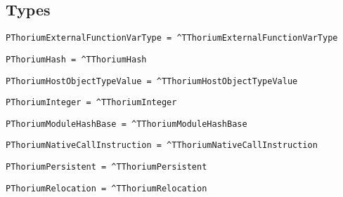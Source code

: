 \subsection{Types}
\label{thoriumtypes}

\begin{verbatim}
PThoriumExternalFunctionVarType = ^TThoriumExternalFunctionVarType
\end{verbatim}
\label{thoriumcore:thorium:pthoriumexternalfunctionvartype}



\begin{verbatim}
PThoriumHash = ^TThoriumHash
\end{verbatim}
\label{thoriumcore:thorium:pthoriumhash}



\begin{verbatim}
PThoriumHostObjectTypeValue = ^TThoriumHostObjectTypeValue
\end{verbatim}
\label{thoriumcore:thorium:pthoriumhostobjecttypevalue}



\begin{verbatim}
PThoriumInteger = ^TThoriumInteger
\end{verbatim}
\label{thoriumcore:thorium:pthoriuminteger}



\begin{verbatim}
PThoriumModuleHashBase = ^TThoriumModuleHashBase
\end{verbatim}
\label{thoriumcore:thorium:pthoriummodulehashbase}



\begin{verbatim}
PThoriumNativeCallInstruction = ^TThoriumNativeCallInstruction
\end{verbatim}
\label{thoriumcore:thorium:pthoriumnativecallinstruction}



\begin{verbatim}
PThoriumPersistent = ^TThoriumPersistent
\end{verbatim}
\label{thoriumcore:thorium:pthoriumpersistent}



\begin{verbatim}
PThoriumRelocation = ^TThoriumRelocation
\end{verbatim}
\label{thoriumcore:thorium:pthoriumrelocation}



